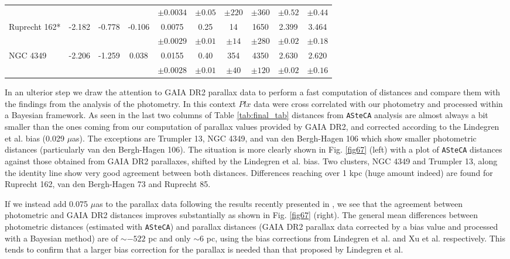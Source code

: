 \documentclass{aa}
\begin{document}
\begin{table*}[ht]
\begin{tabular}{lccccccccc}
 & & & & $\pm0.0034$ & $\pm0.05$ & $\pm220$ & $\pm360$ & $\pm0.52$ & $\pm0.44$ \\
 Ruprecht 162* & -2.182 & -0.778 & -0.106 & 0.0075 & 0.25 & 14 & 1650 & 2.399 & 3.464 \\
 & & & & $\pm0.0029$ & $\pm0.01$ & $\pm14$ & $\pm280$ & $\pm0.02$ & $\pm0.18$ \\
 NGC 4349 & -2.206 & -1.259 & 0.038 & 0.0155 & 0.40 & 354 & 4350 & 2.630 & 2.620\\
 & & & & $\pm0.0028$ & $\pm0.01$ & $\pm40$ & $\pm120$ & $\pm0.02$ & $\pm0.16$ \\
 \hline
\end{tabular}
\caption{Properties of \textcolor{red}{true (Yes) and probable (?)
clusters}. The symbol ``*'' indicates dubious cluster. The $d_{Bayes}$ values
are those obtained using the Bayesian method and the Lindegren et al. bias
correction on the parallax data. Uncertainties for the fundamental parameters are
shown in parenthesis.}
\label{tab:final_tab}
\end{table*}

In an ulterior step we draw the attention to GAIA DR2 parallax data to perform a
fast computation of distances and compare them with the findings from the
analysis of the photometry. In this context $Plx$ data were cross correlated
with our photometry and processed within a Bayesian framework.
As seen in the last two columns of Table \ref{tab:final_tab} distances from
\texttt{ASteCA} analysis are almost always a bit smaller than the ones coming
from our computation of parallax values provided by GAIA DR2, and corrected
according to the Lindegren et al. bias (0.029 $\mu$as). The exceptions are
Trumpler 13, NGC 4349, and van den Bergh-Hagen 106 which show smaller
photometric distances (particularly van den Bergh-Hagen 106).
%
The situation is more clearly shown in Fig. \ref{fig67} (left) with a plot of 
\texttt{ASteCA} distances against those obtained from GAIA DR2 parallaxes,
shifted by the Lindegren et al. bias.
%
Two clusters, NGC 4349 and Trumpler 13, along the identity line show very good
agreement between both distances. Differences reaching over 1 kpc (huge amount
indeed) are found for Ruprecht 162, van den Bergh-Hagen 73 and Ruprecht 85.

If we instead add 0.075 $\mu$as to the parallax data following the results
recently presented in \cite{Xu_2019}, we see that the agreement between
photometric and GAIA DR2 distances improves substantially as shown in Fig. 
\ref{fig67} (right).
%
The general mean differences between photometric distances (estimated with 
\texttt{ASteCA}) and parallax distances (GAIA DR2 parallax data corrected by a
bias value and processed with a Bayesian method) are of $\sim-522$ pc and only
$\sim6$ pc, using the bias corrections from Lindegren et al. and Xu et al.
respectively. This tends to confirm that a larger bias correction for the
parallax is needed than that proposed by Lindegren et al.
\end{document}
